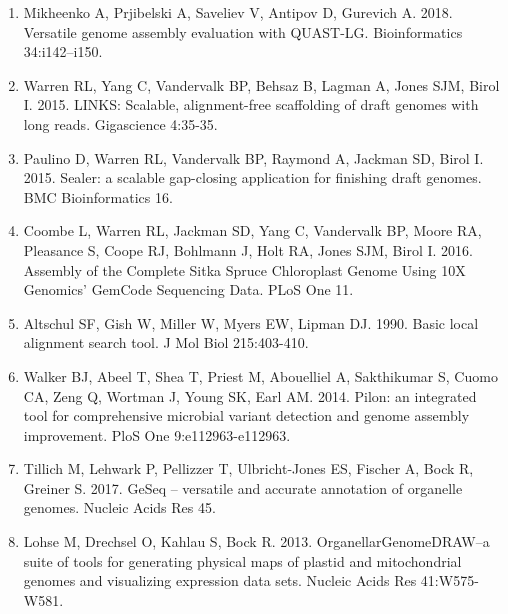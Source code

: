 \documentclass[titlepage,11pt, oneside]{article}   	%
\begin{document}
\begin{enumerate}
\item Mikheenko A, Prjibelski A, Saveliev V, Antipov D, Gurevich A. 2018. Versatile genome assembly evaluation with QUAST-LG. Bioinformatics 34:i142–i150.
\item Warren RL, Yang C, Vandervalk BP, Behsaz B, Lagman A, Jones SJM, Birol I. 2015. LINKS: Scalable, alignment-free scaffolding of draft genomes with long reads. Gigascience 4:35-35.
\item Paulino D, Warren RL, Vandervalk BP, Raymond A, Jackman SD, Birol I. 2015. Sealer: a scalable gap-closing application for finishing draft genomes. BMC Bioinformatics 16.
\item Coombe L, Warren RL, Jackman SD, Yang C, Vandervalk BP, Moore RA, Pleasance S, Coope RJ, Bohlmann J, Holt RA, Jones SJM, Birol I. 2016. Assembly of the Complete Sitka Spruce Chloroplast Genome Using 10X Genomics’ GemCode Sequencing Data. PLoS One 11.
\item Altschul SF, Gish W, Miller W, Myers EW, Lipman DJ. 1990. Basic local alignment search tool. J Mol Biol 215:403-410.
\item Walker BJ, Abeel T, Shea T, Priest M, Abouelliel A, Sakthikumar S, Cuomo CA, Zeng Q, Wortman J, Young SK, Earl AM. 2014. Pilon: an integrated tool for comprehensive microbial variant detection and genome assembly improvement. PloS One 9:e112963-e112963.
\item Tillich M, Lehwark P, Pellizzer T, Ulbricht-Jones ES, Fischer A, Bock R, Greiner S. 2017. GeSeq – versatile and accurate annotation of organelle genomes. Nucleic Acids Res 45.
\item Lohse M, Drechsel O, Kahlau S, Bock R. 2013. OrganellarGenomeDRAW--a suite of tools for generating physical maps of plastid and mitochondrial genomes and visualizing expression data sets. Nucleic Acids Res 41:W575-W581.
\end{enumerate}
\end{document}
